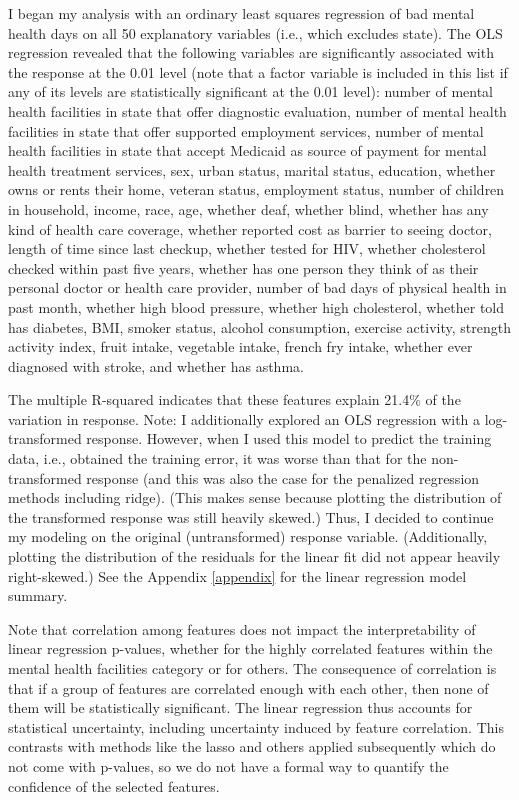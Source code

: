 \documentclass[
]{article}
\begin{document}
I began my analysis with an ordinary least squares regression of bad mental health days on all 50 explanatory variables (i.e., which excludes state). The OLS regression revealed that the following variables are significantly associated with the response at the 0.01 level (note that a factor variable is included in this list if any of its levels are statistically significant at the 0.01 level): number of mental health facilities in state that offer diagnostic evaluation, number of mental health facilities in state that offer supported employment services, number of mental health facilities in state that accept Medicaid as source of payment for mental health treatment services, sex, urban status, marital status, education, whether owns or rents their home, veteran status, employment status, number of children in household, income, race, age, whether deaf, whether blind, whether has any kind of health care coverage, whether reported cost as barrier to seeing doctor, length of time since last checkup, whether tested for HIV, whether cholesterol checked within past five years, whether has one person they think of as their personal doctor or health care provider, number of bad days of physical health in past month, whether high blood pressure, whether high cholesterol, whether told has diabetes, BMI, smoker status, alcohol consumption, exercise activity, strength activity index, fruit intake, vegetable intake, french fry intake, whether ever diagnosed with stroke, and whether has asthma.

The multiple R-squared indicates that these features explain 21.4\% of the variation in response. Note: I additionally explored an OLS regression with a log-transformed response. However, when I used this model to predict the training data, i.e., obtained the training error, it was worse than that for the non-transformed response (and this was also the case for the penalized regression methods including ridge). (This makes sense because plotting the distribution of the transformed response was still heavily skewed.) Thus, I decided to continue my modeling on the original (untransformed) response variable. (Additionally, plotting the distribution of the residuals for the linear fit did not appear heavily right-skewed.) See the Appendix \ref{appendix} for the linear regression model summary.

Note that correlation among features does not impact the interpretability of linear regression p-values, whether for the highly correlated features within the mental health facilities category or for others. The consequence of correlation is that if a group of features are correlated enough with each other, then none of them will be statistically significant. The linear regression thus accounts for statistical uncertainty, including uncertainty induced by feature correlation. This contrasts with methods like the lasso and others applied subsequently which do not come with p-values, so we do not have a formal way to quantify the confidence of the selected features.
\end{document}
